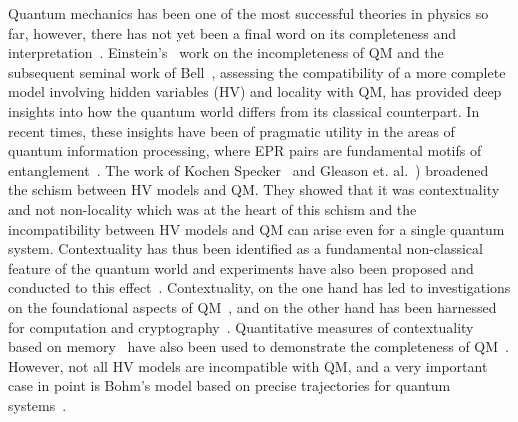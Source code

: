 \documentclass[british,aps,prl,superscriptaddress,nofootinbib,times,reprint]{revtex4-1}
\theoremstyle{plain}
\theoremstyle{definition}
\theoremstyle{remark}
\theoremstyle{remark}
\theoremstyle{remark}
\theoremstyle{plain}
\theoremstyle{plain}
\theoremstyle{plain}
\theoremstyle{definition}
\theoremstyle{definition}
\begin{document}
Quantum mechanics has been one of the most
successful theories in physics so far, however,
there has not yet been a final word on its
completeness and interpretation~\cite{??}.
Einstein's~\cite{EinsteinEPR} work on the
incompleteness of QM and the subsequent seminal
work of Bell~\cite{Bell1964}, assessing the
compatibility of a more complete model involving
hidden variables (HV) and locality with QM, has
provided deep insights into  how the quantum world
differs from its classical counterpart.  In recent
times, these insights have been of pragmatic
utility in the areas of quantum information
processing, where EPR pairs are fundamental motifs
of entanglement~\cite{Ekert,PironioRndmnssCrtfcn}.
The work of  Kochen Specker~\cite{KochenSpecker}
and Gleason et.
al.~\cite{Gleason,BellOnHiddenVariables,Peres,Mermin})
broadened the schism between  HV models and QM.
They showed that it was contextuality and not
non-locality which was at the heart of this schism
and the incompatibility between HV models and QM
can arise even for a single quantum system.
Contextuality has thus been identified as a
fundamental non-classical feature of the quantum
world and experiments have also been proposed and
conducted to this effect~\cite{SimonContExpProp,
HuangContExp,YangContExp,HasegawaContExp}.
Contextuality, on the one hand has led to
investigations on the foundational aspects of
QM~\cite{PawelCntxClsscl,?????}, and on the other
hand has been harnessed for computation and
cryptography~\cite{HowardCntxCmptn,CabelloCntxScrt,??}.
Quantitative measures of contextuality based on
memory~\cite{MatthiasCntxMmry} have also been used
to demonstrate the completeness of
QM~\cite{CabelloMmryQM}.  However, not all HV
models are incompatible with QM, and a very
important case in point is  Bohm's model based on
precise trajectories for quantum
systems~\cite{Bohm1,Bohm2}. 
\end{document}
